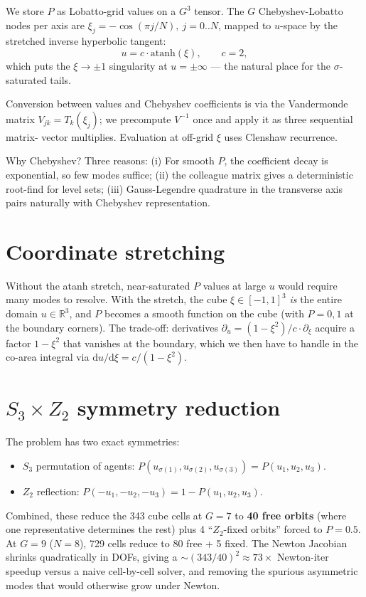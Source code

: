 \documentclass[11pt]{article}
\begin{document}
We store $P$ as Lobatto-grid values on a $G^3$ tensor. The $G$ Chebyshev-Lobatto nodes
per axis are $\xi_j = -\cos(\pi j/N),\ j=0..N$, mapped to $u$-space by the stretched
inverse hyperbolic tangent:
\[
u = c\cdot\mathrm{atanh}(\xi),\qquad c=2,
\]
which puts the $\xi\to\pm 1$ singularity at $u=\pm\infty$ — the natural place for the
$\sigma$-saturated tails.

Conversion between values and Chebyshev coefficients is via the Vandermonde matrix
$V_{jk}=T_k(\xi_j)$; we precompute $V^{-1}$ once and apply it as three sequential matrix-
vector multiplies. Evaluation at off-grid $\xi$ uses Clenshaw recurrence.

Why Chebyshev? Three reasons:
(i) For smooth $P$, the coefficient decay is exponential, so few modes suffice;
(ii) the colleague matrix gives a deterministic root-find for level sets;
(iii) Gauss-Legendre quadrature in the transverse axis pairs naturally with Chebyshev
representation.

\section{Coordinate stretching}

Without the atanh stretch, near-saturated $P$ values at large $u$ would require many
modes to resolve. With the stretch, the cube $\xi\in[-1,1]^3$ \emph{is} the entire
domain $u\in\mathbb R^3$, and $P$ becomes a smooth function on the cube (with $P=0,1$
at the boundary corners). The trade-off: derivatives $\partial_u = (1-\xi^2)/c \cdot \partial_\xi$
acquire a factor $1-\xi^2$ that vanishes at the boundary, which we then have to handle in
the co-area integral via $\mathrm du/\mathrm d\xi = c/(1-\xi^2)$.

\section{$S_3\times Z_2$ symmetry reduction}

The problem has two exact symmetries:
\begin{itemize}
\item $S_3$ permutation of agents: $P(u_{\sigma(1)},u_{\sigma(2)},u_{\sigma(3)}) = P(u_1,u_2,u_3)$.
\item $Z_2$ reflection: $P(-u_1,-u_2,-u_3) = 1 - P(u_1,u_2,u_3)$.
\end{itemize}

Combined, these reduce the 343 cube cells at $G=7$ to \textbf{40 free orbits} (where one
representative determines the rest) plus 4 ``$Z_2$-fixed orbits'' forced to $P=0.5$.
At $G=9$ ($N=8$), 729 cells reduce to 80 free + 5 fixed. The Newton Jacobian shrinks
quadratically in DOFs, giving a $\sim (343/40)^2 \approx 73\times$ Newton-iter speedup
versus a naive cell-by-cell solver, and removing the spurious asymmetric modes that
would otherwise grow under Newton.
\end{document}

